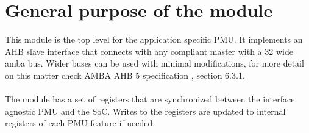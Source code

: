 \newpage
\section{General purpose of the module}
This module is the top level for the application specific PMU. 
It implements an AHB slave interface that connects with any compliant master with a 32 wide amba bus.
Wider buses can be used with minimal modifications, for more detail on this matter check AMBA AHB 5 specification \cite{AHB5-20Jul}, section 6.3.1.\\
\\
The module has a set of registers that are synchronized between the interface agnostic PMU and the SoC. Writes to the registers are updated to internal registers of each PMU feature if needed.